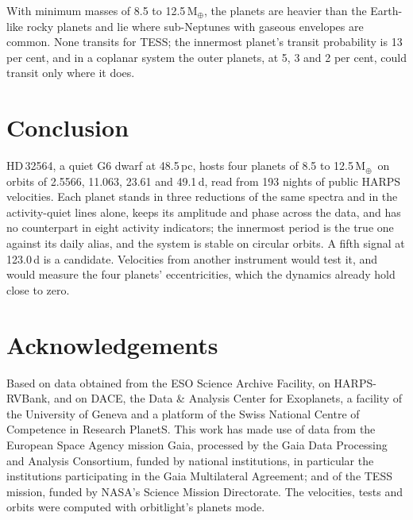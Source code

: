 \documentclass[3p,11pt]{elsarticle}
\newcommand{\Mearth}{M$_\oplus$}
\begin{document}
With minimum masses of 8.5 to 12.5\,\Mearth, the planets are heavier than the Earth-like rocky planets and
lie where sub-Neptunes with gaseous envelopes are common. None transits for TESS; the innermost
planet's transit probability is 13 per cent, and in a coplanar system the outer planets, at 5, 3 and 2
per cent, could transit only where it does.

\section{Conclusion}\label{sec:conclusion}

HD\,32564, a quiet G6 dwarf at 48.5\,pc, hosts four planets of 8.5 to 12.5\,\Mearth\ on orbits
of 2.5566, 11.063, 23.61 and 49.1\,d, read from 193 nights of public HARPS velocities. Each planet
stands in three reductions of the same spectra and in the activity-quiet lines alone, keeps its
amplitude and phase across the data, and has no counterpart in eight activity indicators; the
innermost period is the true one against its daily alias, and the system is stable on circular orbits.
A fifth signal at 123.0\,d is a candidate. Velocities from another instrument would test it, and would
measure the four planets' eccentricities, which the dynamics already hold close to zero.

\section*{Acknowledgements}

Based on data obtained from the ESO Science Archive Facility, on HARPS-RVBank, and on DACE, the Data \&
Analysis Center for Exoplanets, a facility of the University of Geneva and a platform of the Swiss
National Centre of Competence in Research PlanetS. This work has made use of data from the European
Space Agency mission Gaia, processed by the Gaia Data Processing and Analysis Consortium, funded by
national institutions, in particular the institutions participating in the Gaia Multilateral Agreement;
and of the TESS mission, funded by NASA's Science Mission Directorate. The velocities, tests and orbits
were computed with orbitlight's planets mode.
\end{document}
